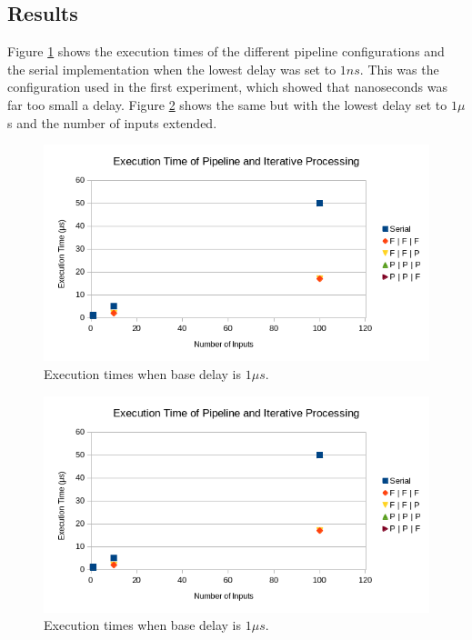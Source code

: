 \documentclass[12pt]{article}
\begin{document}
\subsection{Results}

Figure \ref{fig:results} shows the execution times of the different pipeline configurations and the serial implementation when the lowest delay was set to $1ns$. This was the configuration used in the first experiment, which showed that nanoseconds was far too small a delay. Figure \ref{fig:results2} shows the same but with the lowest delay set to $1\mu$s and the number of inputs extended.

\begin{figure}[!ht]
	\centering 
	\includegraphics[width=\linewidth]{images/results}
	\caption{Execution times when base delay is $1\mu s$.}
	\label{fig:results}
\end{figure}

\begin{figure}[!ht]
	\centering 
	\includegraphics[width=\linewidth]{images/results}
	\caption{Execution times when base delay is $1\mu s$.}
	\label{fig:results2}
\end{figure}
\end{document}
